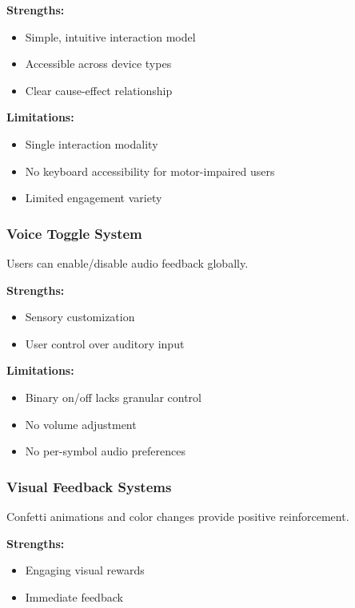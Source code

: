 \documentclass[12pt, a4paper]{article}
\begin{document}
\textbf{Strengths:}
\begin{itemize}[leftmargin=*]
    \item Simple, intuitive interaction model
    \item Accessible across device types
    \item Clear cause-effect relationship
\end{itemize}

\textbf{Limitations:}
\begin{itemize}[leftmargin=*]
    \item Single interaction modality
    \item No keyboard accessibility for motor-impaired users
    \item Limited engagement variety
\end{itemize}

\subsubsection{Voice Toggle System}

Users can enable/disable audio feedback globally.

\textbf{Strengths:}
\begin{itemize}[leftmargin=*]
    \item Sensory customization
    \item User control over auditory input
\end{itemize}

\textbf{Limitations:}
\begin{itemize}[leftmargin=*]
    \item Binary on/off lacks granular control
    \item No volume adjustment
    \item No per-symbol audio preferences
\end{itemize}

\subsubsection{Visual Feedback Systems}

Confetti animations and color changes provide positive reinforcement.

\textbf{Strengths:}
\begin{itemize}[leftmargin=*]
    \item Engaging visual rewards
    \item Immediate feedback
\end{itemize}
\end{document}
